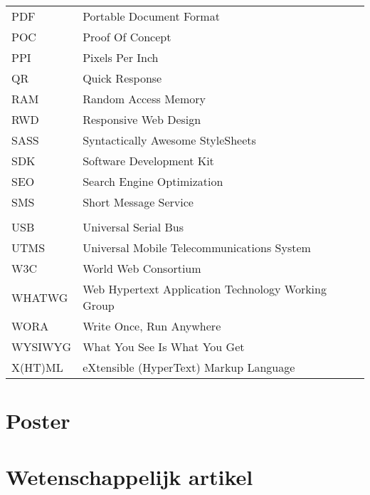 \documentclass[master=cws,dutch,masteroption={vs,gs},inputenc=utf8]{kulemt}
\begin{document}
\begin{flushleft}
\begin{longtable}{p{2cm} l}
     PDF & Portable Document Format \\
     POC & Proof Of Concept \\
     PPI & Pixels Per Inch \\
     QR & Quick Response \\
     RAM & Random Access Memory \\
     RWD & Responsive Web Design \\
     SASS & Syntactically Awesome StyleSheets \\
     SDK & Software Development Kit \\
     SEO & Search Engine Optimization \\
     SMS & Short Message Service \\
     \sta{} & \st{} \\
     USB & Universal Serial Bus \\
     UTMS & Universal Mobile Telecommunications System \\
     W3C & World Web Consortium \\
     WHATWG & Web Hypertext Application Technology Working Group \\
     WORA & Write Once, Run Anywhere \\
     WYSIWYG & What You See Is What You Get \\
     X(HT)ML & eXtensible (HyperText) Markup Language \\ 
  \end{longtable}
\end{flushleft}

\mainmatter













\appendixpage*          
\appendix
\chapter{Poster}

\chapter{Wetenschappelijk artikel}




\backmatter


\end{document}
